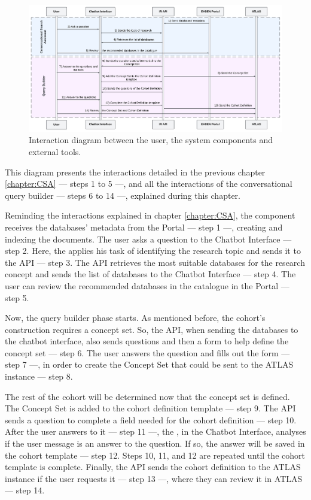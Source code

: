 \begin{figure}[H]
  \includegraphics[width=\textwidth]{figs/chapter4/interaction_diagram2.png}
  \centering
  \caption{Interaction diagram between the user, the system components and external tools.}
  \label{fig_interaction}
\end{figure}

This diagram presents the interactions detailed in the previous chapter \ref{chapter:CSA} — steps 1 to 5 —, and all the interactions of the conversational query builder — steps 6 to 14 —, explained during this chapter.

Reminding the interactions explained in chapter \ref{chapter:CSA}, the {\ir} component receives the databases' metadata from the {\ehden} Portal — step 1 —, creating and indexing the documents. The user asks a question to the Chatbot Interface — step 2. Here, the {\llm} applies his task of identifying the research topic and sends it to the {\ir} API — step 3. The {\ir} API retrieves the most suitable databases for the research concept and sends the list of databases to the Chatbot Interface — step 4. The user can review the recommended databases in the catalogue in the {\ehden} Portal — step 5. 

Now, the query builder phase starts. As mentioned before, the cohort's construction requires a concept set. So, the {\ir} API, when sending the databases to the chatbot interface, also sends questions and then a form to help define the concept set — step 6. The user answers the question and fills out the form — step 7 —, in order to create the Concept Set that could be sent to the ATLAS instance — step 8. 

The rest of the cohort will be determined now that the concept set is defined. The Concept Set is added to the cohort definition template  — step 9. The {\ir} API sends a question to complete a field needed for the cohort definition  — step 10. After the user answers to it  — step 11 —, the {\llm}, in the Chatbot Interface, analyses if the user message is an answer to the question. If so, the answer will be saved in the cohort template — step 12. Steps 10, 11, and 12 are repeated until the cohort template is complete. Finally, the API sends the cohort definition to the ATLAS instance if the user requests it — step 13 —, where they can review it in ATLAS — step 14.



